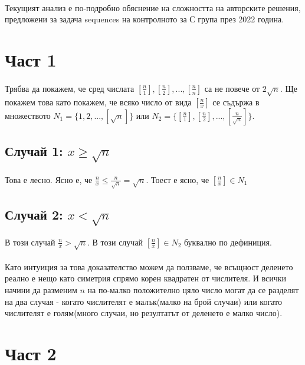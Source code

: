 \documentclass[12pt]{article}
\begin{document}
\paragraph*{}
Текущият анализ е по-подробно обяснение на сложността на авторските решения, предложени за задача sequences на контролното за С група през 2022 година.

\section*{Част 1}
\paragraph*{}
Трябва да покажем, че сред числата $[\frac{n}{1}], [\frac{n}{2}], ..., [\frac{n}{n}]$ са не повече от $2 \sqrt{n}$. Ще покажем това като покажем, че всяко число от вида $[\frac{n}{x}]$ се съдържа в множеството $N_1 = \{1, 2, ..., [\sqrt{n}] \}$ или $N_2 = \{ [\frac{n}{1}], [\frac{n}{2}], ..., [\frac{n}{\sqrt{n}}] \}$.

\subsection*{Случай 1: $x \geq \sqrt{n}$}
\paragraph*{}
Това е лесно. Ясно е, че $\frac{n}{x} \leq \frac{n}{\sqrt{n}} = \sqrt{n}$. Тоест е ясно, че $[\frac{n}{x}] \in N_1$

\subsection*{Случай 2: $x < \sqrt{n}$}
В този случай $\frac{n}{x} > \sqrt{n}$. В този случай $[\frac{n}{x}] \in N_2$ буквално по дефиниция.

\paragraph*{}
Като интуиция за това доказателство можем да ползваме, че всъщност деленето реално е нещо като симетрия спрямо корен квадратен от числителя. И всички начини да разменим $n$ на по-малко положително цяло число могат да се разделят на два случая - когато числителят е малък(малко на брой случаи) или когато числителят е голям(много случаи, но резултатът от деленето е малко число).

\section*{Част 2}
\end{document}

